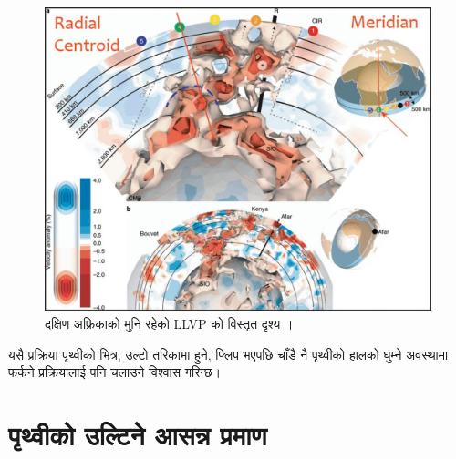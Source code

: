 \documentclass[10pt,twocolumn,letterpaper]{article}
\begin{document}
\begin{figure}[t]
\begin{center}
   \includegraphics[width=1\linewidth]{llvp.jpg}
\end{center}
   \caption{दक्षिण अफ्रिकाको मुनि रहेको LLVP को विस्तृत दृश्य \cite{28}।}

\label{fig:12}
\label{fig:onecol}
\end{figure}


यसै प्रक्रिया पृथ्वीको भित्र, उल्टो तरिकामा हुने, फ्लिप भएपछि चाँडै नै पृथ्वीको हालको घुम्ने अवस्थामा फर्कने प्रक्रियालाई पनि चलाउने विश्वास गरिन्छ।

\section{पृथ्वीको उल्टिने आसन्न प्रमाण}
\end{document}
